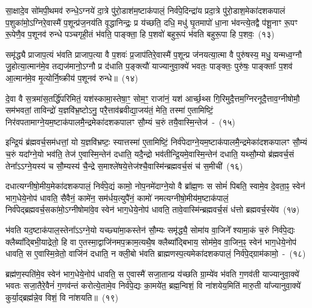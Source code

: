 सा॒क्षादे॒व सो॑मपी॒थमव॑ रुन्धे॒\-ऽग्नये॑ दा॒त्रे पु॑रो॒डाश॑म॒ष्टा\-क॑पालं॒ निर्व॑पे॒दिन्द्रा॑य प्रदा॒त्रे पु॑रो॒डाश॒मेका॑\-दश\-कपालं प॒शुका॑मो॒\-ऽग्निरे॒वास्मै॑ प॒शून्प्र॑ज॒नय॑ति वृ॒द्धानिन्द्रः॒ प्र य॑च्छति॒ दधि॒ मधु॑ घृ॒तमापो॑ धा॒ना भ॑वन्त्ये॒तद्वै प॑शू॒नाꣳ रू॒पꣳ रू॒पेणै॒व प॒शूनव॑ रुन्धे पञ्चगृही॒तं भ॑वति॒ पाङ्क्ता॒ हि प॒शवो॑ बहुरू॒पं भ॑वति बहुरू॒पा हि प॒शवः॒~(१३)\ip

समृ॑द्ध्यै प्राजाप॒त्यं भ॑वति प्राजाप॒त्या वै प॒शवः॑ प्र॒जा\-प॑तिरे॒वास्मै॑ प॒शून्प्र ज॑नयत्या॒त्मा वै पुरु॑षस्य॒ मधु॒ यन्मध्व॒ग्नौ जु॒होत्या॒त्मान॑मे॒व तद्यज॑मानो॒\-ऽग्नौ प्र द॑धाति प॒ङ्क्त्यौ॑ याज्यानुवा॒क्ये॑ भवतः॒ पाङ्क्तः॒ पुरु॑षः॒ पाङ्क्ताः᳚ प॒शव॑ आ॒त्मान॑मे॒व मृ॒त्योर्नि॒ष्क्रीय॑ प॒शूनव॑ रुन्धे॥~(१४)\ip

{\anuvakamend[{इ॒न्द्रि॒ये᳚\-ऽस्मि॒न्भूम्या॑ ए॒तामिन्द्रः॒ स्यात्तस्मै॒ सोमो॑ बहुरू॒पा हि प॒शव॒ एक॑चत्वारिꣳशच्च}]}

दे॒वा वै स॒त्रमा॑स॒तर्द्धि॑परिमितं॒ यश॑स्कामा॒स्तेषा॒ꣳ॒ सोम॒ꣳ॒ राजा॑नं॒ यश॑ आर्च्छ॒थ्स गि॒रिमुदै॒त्तम॒ग्निरनूदै॒त्ताव॒ग्नी\-षोमौ॒ सम॑भवतां॒ ताविन्द्रो॑ य॒ज्ञवि॑भ्र॒ष्टो\-ऽनु॒ परै॒त्ताव॑ब्रवीद्या॒जय॑तं॒ मेति॒ तस्मा॑ ए॒तामिष्टिं॒ निर॑वपता\-माग्ने॒य\-म॒ष्टाक॑पाल\-मै॒न्द्रमेका॑\-दश\-कपालꣳ सौ॒म्यं च॒रुं तयै॒वास्मि॒न्तेज॑~-~(१५)\ip

इन्द्रि॒यं ब्र॑ह्मवर्च॒सम॑धत्तां॒ यो य॒ज्ञवि॑भ्रष्टः॒ स्यात्तस्मा॑ ए॒तामिष्टिं॒ निर्व॑पेदाग्ने॒यम॒ष्टा\-क॑पालमै॒न्द्र\-मेका॑\-दश\-कपालꣳ सौ॒म्यं च॒रुं यदा᳚ग्ने॒यो भव॑ति॒ तेज॑ ए॒वास्मि॒न्तेन॑ दधाति॒ यदै॒न्द्रो भव॑तीन्द्रि॒यमे॒वास्मि॒न्तेन॑ दधाति॒ यथ्सौ॒म्यो ब्र॑ह्मवर्च॒सं तेना᳚\-ऽऽ\-ग्ने॒यस्य॑ च सौ॒म्यस्य॑ चै॒न्द्रे स॒माश्ले॑षये॒त्तेज॑श्चै॒वास्मि॑न्ब्रह्मवर्च॒सं च॑ स॒मीची॑~(१६)\ip

दधात्यग्नीषो॒मीय॒मेका॑\-दश\-कपालं॒ निर्व॑पे॒द्यं कामो॒ नोप॒नमे॑दा\-ग्ने॒यो वै ब्रा᳚ह्म॒णः स सोमं॑ पिबति॒ स्वामे॒व दे॒वता॒ꣴ॒ स्वेन॑ भाग॒धेये॒नोप॑ धावति॒ सैवैनं॒ कामे॑न॒ सम॑र्धय॒त्युपै॑नं॒ कामो॑ नमत्यग्नीषो॒मीय॑म॒ष्टा\-क॑पालं॒ निर्व॑पेद्ब्रह्मवर्च॒सका॑मो॒\-ऽग्नी\-षोमा॑वे॒व स्वेन॑ भाग॒धेये॒नोप॑ धावति॒ तावे॒वास्मि॑न्ब्रह्मवर्च॒सं ध॑त्तो ब्रह्मवर्च॒स्ये॑व~(१७)\ip

भ॑वति यद॒ष्टाक॑पाल॒स्तेना᳚\-ऽऽ\-ग्ने॒यो यच्छ्या॑मा॒कस्तेन॑ सौ॒म्यः समृ॑द्ध्यै॒ सोमा॑य वा॒जिने᳚ श्यामा॒कं च॒रुं निर्व॑पे॒द्यः क्लैब्या᳚द्बिभी॒याद्रेतो॒ हि वा ए॒तस्मा॒द्वाजि॑नमप॒क्राम॒त्यथै॒ष क्लैब्या᳚द्बिभाय॒ सोम॑मे॒व वा॒जिन॒ꣴ॒ स्वेन॑ भाग॒धेये॒नोप॑ धावति॒ स ए॒वास्मि॒न्रेतो॒ वाजि॑नं दधाति॒ न क्ली॒बो भ॑वति ब्राह्मणस्प॒त्यमेका॑\-दश\-कपालं॒ निर्व॑पे॒द्ग्राम॑कामो॒~-~(१८)\ip

ब्रह्म॑ण॒स्पति॑मे॒व स्वेन॑ भाग॒धेये॒नोप॑ धावति॒ स ए॒वास्मै॑ सजा॒तान्प्र य॑च्छति ग्रा॒म्ये॑व भ॑वति ग॒णव॑ती याज्यानुवा॒क्ये॑ भवतः सजा॒तैरे॒वैनं॑ ग॒णव॑न्तं करोत्ये॒तामे॒व निर्व॑पे॒द्यः का॒मये॑त॒ ब्रह्म॒न्विशं॒ वि ना॑शयेय॒मिति॑ मारु॒ती या᳚ज्यानुवा॒क्ये॑ कुर्या॒द्ब्रह्म॑न्ने॒व विशं॒ वि ना॑शयति॥~(१९)\ip


